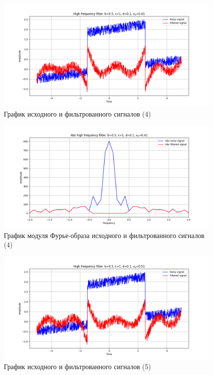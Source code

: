 \documentclass[a4paper, 12pt]{article}
\begin{document}
    \begin{figure}[!htb]
        \centering
        \includegraphics[scale=0.48]{4_u_flt_u_nolow.png}
        \captionsetup{skip=0pt}
        \caption{График исходного и фильтрованного сигналов (4)}
        \label{fig:fig33}
    \end{figure}
    \begin{figure}[!htb]
        \centering
        \includegraphics[scale=0.48]{4_abs_u_U_nolow.png}
        \captionsetup{skip=0pt}
        \caption{График модуля Фурье-образа исходного и фильтрованного сигналов (4)}
        \label{fig:fig34}
    \end{figure}
    \newpage
    \begin{figure}[!htb]
        \centering
        \includegraphics[scale=0.48]{5_u_flt_u_nolow.png}
        \captionsetup{skip=0pt}
        \caption{График исходного и фильтрованного сигналов (5)}
        \label{fig:fig35}
    \end{figure}
\end{document}
